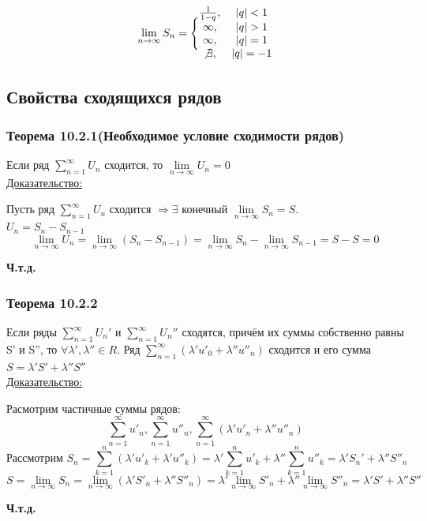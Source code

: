 \documentclass[12pt]{article}
\let\oldsum\sum
\let\oldlim\lim
\renewcommand{\sum}{\oldsum\limits}
\renewcommand{\lim}{\oldlim\limits}
\begin{document}
  \[\lim_{n \to \infty} S_n =\Bigg\{ 
    \begin{matrix}
      \frac{1}{1-q}, & |q|<1\\
      \infty, & |q|>1\\
      \infty, & |q|=1\\
      \not \exists, & |q|=-1
    \end{matrix}\]



  \subsection{Свойства сходящихся рядов}
  \subsubsection*{Теорема 10.2.1(Необходимое условие сходимости рядов)}\label{th:10.2.1}
  \par\noindent
  Если ряд $\sum_{n=1}^{\infty} U_n$ сходится, то $\lim_{n \to \infty} U_n =0$\\
  \underline{Доказательство:}
  \begin{adjustwidth}{1.5em}{1.5em}
    Пусть ряд $\sum_{n=1}^{\infty} U_n$ сходится $\Rightarrow \exists$ конечный $\lim_{n \to \infty} S_n =S$.\\
     $U_n=S_n-S_{n-1}$
    \[\lim_{n \to \infty} U_n = \lim_{n \to \infty} (S_n - S_{n-1}) = \lim_{n \to \infty} S_n - \lim_{n \to \infty} S_{n-1} = S-S = 0\]
  \end{adjustwidth}
  \begin{center}
    \textbf{Ч.т.д.}
  \end{center}
  \subsubsection*{Теорема 10.2.2}\label{th:10.2.2}
  \par\noindent
  Если ряды $\sum_{n=1}^{\infty} U_n' $ и $\sum_{n=1}^{\infty} U_n''$ сходятся, причём их суммы собственно равны S' и S'',
  то $\forall \lambda',\lambda'' \in R$. Ряд $\sum^{\infty}_{n=1}(\lambda' u'_0+\lambda''u''_n)$ сходится и его
  сумма $S=\lambda'S'+\lambda''S''$\\
  \underline{Доказательство:}
  \begin{adjustwidth}{1.5em}{1.5em}
    Расмотрим частичные суммы рядов:
    \[\sum^{\infty}_{n=1} u'_n, \sum_{n=1}^{\infty}u''_n,\sum_{n=1}^{\infty}(\lambda'u'_n+\lambda''u''_n)\]
    \[\text{Рассмотрим } S_n=
    \sum_{k=1}^{n}(\lambda'u'_k+\lambda'u''_k)=
    \lambda'\sum_{k=1}^{n}u'_k+\lambda''\sum_{k=1}^{n}u''_k=\lambda'S_n'+\lambda''S''_n\]
    \[S=\lim_{n\to \infty} S_n=
    \lim_{n \to \infty}(\lambda'S'_n+\lambda''S''_n)=
    \lambda'\lim_{n\to \infty}S'_n+\lambda''\lim_{n \to \infty}S''_n=\lambda'S'+\lambda''S''\]
  \end{adjustwidth}
  \begin{center}
    \textbf{Ч.т.д.}
  \end{center}
\end{document}

